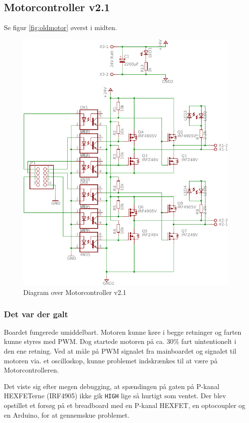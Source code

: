 \documentclass[a4paper,11pt,oneside,article,danish,table]{memoir}
\newcommand{\boarddate}[1]{\marginpar{\tiny\textcolor{blue!80!black}{#1}}}
\begin{document}
\subsection{Motorcontroller v2.1}
\boarddate{8 marts 2012}
Se figur \ref{fig:oldmotor} øverst i midten.
\begin{figure}[htbp]
  \centering
  \includegraphics[width=\textwidth]{pictures/MotorcontrollerSch2-1.pdf}
  \caption{Diagram over Motorcontroller v2.1}
  \label{fig:mosch2.1}
\end{figure}
\subsubsection{Det var der galt}
\label{sec:Motorcontroller2.1}
Boardet fungerede umiddelbart. Motoren kunne køre i begge retninger og farten kunne styres med PWM. Dog startede motoren på ca. 30\% fart uintentionelt i den ene retning. Ved at måle på PWM signalet fra mainboardet og signalet til motoren via. et oscilloskop, kunne problemet indskrænkes til at være på Motorcontrolleren.

Det viste sig efter megen debugging, at spændingen på gaten på P-kanal HEXFETerne (IRF4905) ikke gik \lstinline{HIGH} lige så hurtigt som ventet. Der blev opstillet et forsøg på et breadboard med en P-kanal HEXFET, en optocoupler og en Arduino, for at gennemskue problemet.
\end{document}
